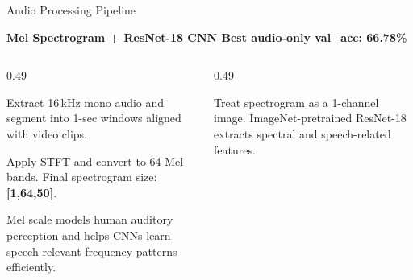 \documentclass[aspectratio=169, 10pt]{beamer}
\begin{document}
\begin{frame}{Audio Processing Pipeline}
\small

\textcolor{NavyBlue}{\footnotesize\bfseries
Mel Spectrogram + ResNet-18 CNN \hfill Best audio-only val\_acc: 66.78\%}

\vspace{3pt}

\begin{columns}[T,onlytextwidth]

\begin{column}{0.49\textwidth}

\begin{tcolorbox}[
tealcard,
title={\small Step 1 --- Audio Extraction},
boxsep=2pt,
left=3pt,right=3pt,
top=3pt,bottom=3pt]

\footnotesize
Extract 16\,kHz mono audio and segment into 1-sec windows aligned with video clips.

\end{tcolorbox}

\vspace{2pt}

\begin{tcolorbox}[
tealcard,
title={\small Step 2 --- Mel Spectrogram},
boxsep=2pt,
left=3pt,right=3pt,
top=3pt,bottom=3pt]

\footnotesize
Apply STFT and convert to 64 Mel bands.
Final spectrogram size: \textbf{[1,64,50]}.

\end{tcolorbox}

\vspace{2pt}

\begin{tcolorbox}[
orangecard,
title={\small Why Mel Scale?},
boxsep=2pt,
left=3pt,right=3pt,
top=3pt,bottom=3pt]

\footnotesize
Mel scale models human auditory perception and helps CNNs learn speech-relevant frequency patterns efficiently.

\end{tcolorbox}

\end{column}

\begin{column}{0.49\textwidth}

\begin{tcolorbox}[
tealcard,
title={\small Step 3 --- ResNet-18 Audio CNN},
boxsep=2pt,
left=3pt,right=3pt,
top=3pt,bottom=3pt]

\footnotesize
Treat spectrogram as a 1-channel image.
ImageNet-pretrained ResNet-18 extracts spectral and speech-related features.


\end{tcolorbox}
\end{column}
\end{columns}
\end{frame}
\end{document}
